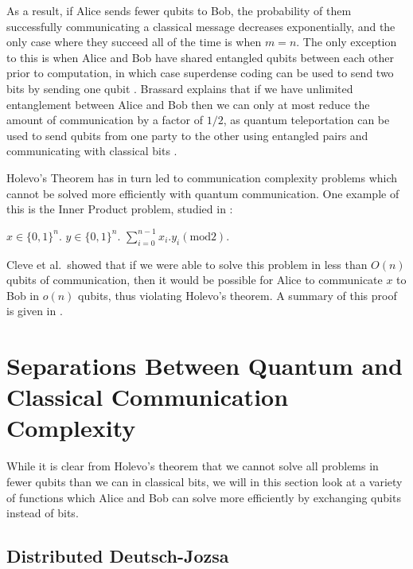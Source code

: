 \documentclass[a4paper]{article}
\begin{document}
        As a result, if Alice sends fewer qubits to Bob, the probability of them successfully communicating a classical message decreases exponentially, and the only case where they succeed all of the time is when $m = n$. The only exception to this is when Alice and Bob have shared entangled qubits between each other prior to computation, in which case superdense coding can be used to send two bits by sending one qubit \cite{PhysRevLett.69.2881}. Brassard \cite{quant-ph/0101005} explains that if we have unlimited entanglement between Alice and Bob then we can only at most reduce the amount of communication by a factor of $1/2$, as quantum teleportation can be used to send qubits from one party to the other using entangled pairs and communicating with classical bits \cite{PhysRevLett.70.1895}.

        Holevo's Theorem has in turn led to communication complexity problems which cannot be solved more efficiently with quantum communication. One example of this is the Inner Product problem, studied in \cite{Cleve201311}:

        \begin{codebox}
            \zi {} $x \in \{0, 1\}^n$.
            \zi {} $y \in \{0, 1\}^n$.
            \zi {} $\sum_{i = 0}^{n - 1}x_i.y_i (\textrm{mod} 2)$.
        \end{codebox}

        Cleve et al.~showed that if we were able to solve this problem in less than $O(n)$ qubits of communication, then it would be possible for Alice to communicate $x$ to Bob in $o(n)$ qubits, thus violating Holevo's theorem. A summary of this proof is given in \cite{RevModPhys.82.665}.

    \section{Separations Between Quantum and Classical Communication Complexity}
    \label{sec:separations}

        While it is clear from Holevo's theorem that we cannot solve all problems in fewer qubits than we can in classical bits, we will in this section look at a variety of functions which Alice and Bob can solve more efficiently by exchanging qubits instead of bits.

        \subsection{Distributed Deutsch-Jozsa}
\end{document}
